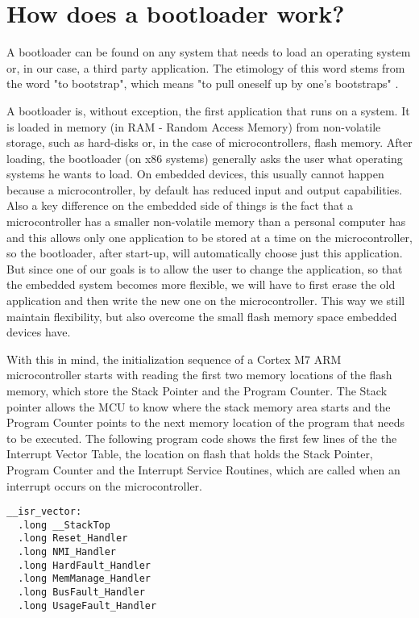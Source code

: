 \documentclass[10pt,a4paper,twoside]{article}
\begin{document}
\section{How does a bootloader work?}
A bootloader can be found on any system that needs to load an operating system or, in our case, a third party application. The etimology of this word stems from the word "to bootstrap", which means "to pull oneself up by one's bootstraps" \cite{bootstrapping}.

A bootloader is, without exception, the first application that runs on a system. It is loaded in memory (in RAM - Random Access Memory) from non-volatile storage, such as hard-disks or, in the case of microcontrollers, flash memory. After loading, the bootloader (on x86 systems) generally asks the user what operating systems he wants to load. On embedded devices, this usually cannot happen because a microcontroller, by default has reduced input and output capabilities. Also a key difference on the embedded side of things is the fact that a microcontroller has a smaller non-volatile memory than a personal computer has and this allows only one application to be stored at a time on the microcontroller, so the bootloader, after start-up, will automatically choose just this application.
But since one of our goals is to allow the user to change the application, so that the embedded system becomes more flexible, we will have to first erase the old application and then write the new one on the microcontroller. This way we still maintain flexibility, but also overcome the small flash memory space embedded devices have.

With this in mind, the initialization sequence of a Cortex M7 ARM microcontroller starts with reading the first two memory locations of the flash memory, which store the Stack Pointer and the Program Counter.
The Stack pointer allows the MCU to know where the stack memory area starts and the Program Counter points to the next memory location of the program that needs to be executed.
The following program code shows the first few lines of the the Interrupt Vector Table, the location on flash that holds the Stack Pointer, Program Counter and the Interrupt Service Routines, which are called when an interrupt occurs on the microcontroller.
\begin{verbatim}
__isr_vector:
  .long __StackTop
  .long Reset_Handler
  .long NMI_Handler
  .long HardFault_Handler
  .long MemManage_Handler
  .long BusFault_Handler
  .long UsageFault_Handler
\end{verbatim}
\end{document}
